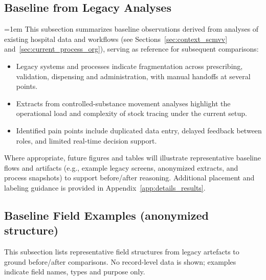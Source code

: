 \subsection{Baseline from Legacy Analyses}
\begingroup\emergencystretch=1em
This subsection summarizes baseline observations derived from analyses of existing hospital data and workflows (see Sections~\ref{sec:context_scmvv} and~\ref{sec:current_process_org}), serving as reference for subsequent comparisons:
\begin{itemize}
    \item Legacy systems and processes indicate fragmentation across prescribing, validation, dispensing and administration, with manual handoffs at several points.
    \item Extracts from controlled-substance movement analyses highlight the operational load and complexity of stock tracing under the current setup.
    \item Identified pain points include duplicated data entry, delayed feedback between roles, and limited real-time decision support.
\end{itemize}
Where appropriate, future figures and tables will illustrate representative baseline flows and artifacts (e.g., example legacy screens, anonymized extracts, and process snapshots) to support before/after reasoning.
Additional placement and labeling guidance is provided in Appendix~\ref{app:details_results}.
\endgroup

\subsection{Baseline Field Examples (anonymized structure)}
This subsection lists representative field structures from legacy artefacts to ground before/after comparisons. No record-level data is shown; examples indicate field names, types and purpose only.

